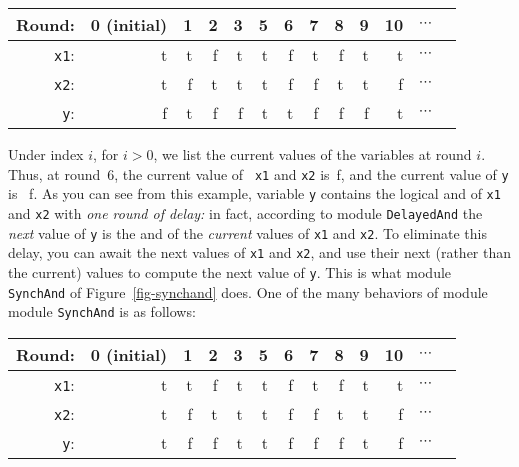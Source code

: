 \begin{center}
\begin{tabular}{r|rrrrrrrrrrrc}
Round: 
 & 0 (initial) & 1 & 2 & 3 & 5 & 6 & 7 & 8 & 9 & 10 & $\cdots$ \\ \hline
{\tt x1}:  & {\sc t} & {\sc t} & {\sc f} & {\sc t} & {\sc t} & {\sc f} & {\sc t} & {\sc f} & {\sc t} & {\sc t} & $\cdots$ \\
{\tt x2}:  & {\sc t} & {\sc f} & {\sc t} & {\sc t} & {\sc t} & {\sc f} & {\sc f} & {\sc t} & {\sc t} & {\sc f} & $\cdots$ \\
{\tt y}:   & {\sc f} & {\sc t} & {\sc f} & {\sc f} & {\sc t} & {\sc t} & {\sc f} & {\sc f} & {\sc f} & {\sc t} & $\cdots$ \\ \hline
\end{tabular}
\end{center}

\noindent
Under index $i$, for $i > 0$, we list the current values of the
variables at round $i$. Thus, at round~6, the current value of {\tt
x1} and {\tt x2} is~{\sc f}, and the current value of {\tt y} is~{\sc
f}.  As you can see from this example, variable {\tt y} contains the
logical {\sc and} of {\tt x1} and {\tt x2} with {\em one round of
delay:\/} in fact, according to module {\tt DelayedAnd} the {\em
next\/} value of {\tt y} is the {\sc and} of the {\em current\/}
values of {\tt x1} and {\tt x2}.  To eliminate this delay, you can
await the next values of {\tt x1} and {\tt x2}, and use their next
(rather than the current) values to compute the next value of {\tt y}.
This is what module {\tt SynchAnd} of Figure~\ref{fig-synchand} does.
One of the many behaviors of module module {\tt SynchAnd} is as
follows:  

\begin{center}
\begin{tabular}{r|rrrrrrrrrrrc}
Round: 
 & 0 (initial) & 1 & 2 & 3 & 5 & 6 & 7 & 8 & 9 & 10 & $\cdots$ \\ \hline
{\tt x1}:  & {\sc t} & {\sc t} & {\sc f} & {\sc t} & {\sc t} & {\sc f} & {\sc t} & {\sc f} & {\sc t} & {\sc t} & $\cdots$ \\
{\tt x2}:  & {\sc t} & {\sc f} & {\sc t} & {\sc t} & {\sc t} & {\sc f} & {\sc f} & {\sc t} & {\sc t} & {\sc f} & $\cdots$ \\
{\tt y}:   & {\sc t} & {\sc f} & {\sc f} & {\sc t} & {\sc t} & {\sc f} & {\sc f} & {\sc f} & {\sc t} & {\sc f} & $\cdots$ \\ \hline
\end{tabular}
\end{center}

